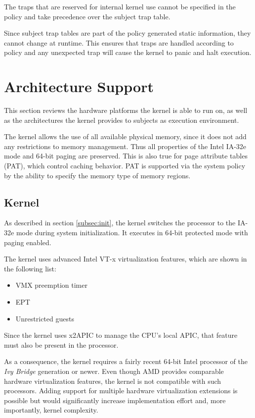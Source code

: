 The traps that are reserved for internal kernel use cannot be specified in the
policy and take precedence over the subject trap table.

Since subject trap tables are part of the policy generated static information,
they cannot change at runtime. This ensures that traps are handled according to
policy and any unexpected trap will cause the kernel to panic and halt
execution.

\section{Architecture Support}\label{sec:arch-support}
This section reviews the hardware platforms the kernel is able to run on, as
well as the architectures the kernel provides to subjects as execution
environment.

The kernel allows the use of all available physical memory, since it does not
add any restrictions to memory management. Thus all properties of the Intel
IA-32e mode and 64-bit paging are preserved. This is also true for page
attribute tables (PAT), which control caching behavior. PAT is supported via the
system policy by the ability to specify the memory type of memory regions.

\subsection{Kernel}
As described in section \ref{subsec:init}, the kernel switches the processor to
the IA-32e mode during system initialization. It executes in 64-bit protected
mode with paging enabled.

The kernel uses advanced Intel VT-x virtualization features, which are shown in
the following list:

\begin{itemize}
	\item VMX preemption timer
	\item EPT
	\item Unrestricted guests
\end{itemize}

Since the kernel uses x2APIC to manage the CPU's local APIC, that feature must
also be present in the processor.

As a consequence, the kernel requires a fairly recent 64-bit Intel processor of
the \emph{Ivy Bridge} generation or newer. Even though AMD provides comparable
hardware virtualization features, the kernel is not compatible with such
processors. Adding support for multiple hardware virtualization extensions is
possible but would significantly increase implementation effort and, more
importantly, kernel complexity.

